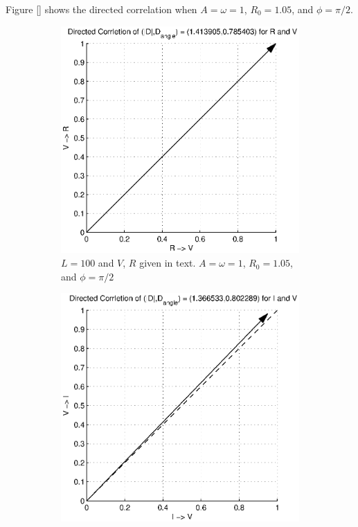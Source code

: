 \documentclass[a4paper,11pt]{article}
\begin{document}
Figure \ref{} shows the directed correlation when $A=\omega=1$, $R_0=1.05$, and $\phi=\pi/2$.
\begin{figure}[h!t]
\centering
\begin{subfigure}[b]{0.25\textwidth}
\label{fig:RL_Rsin3VsinCCMVR}
\includegraphics[scale=0.4]{graphics/RL_Rsin3VsinCCMVR.eps}
\caption{$L = 100$ and $V$, $R$ given in text. $A=\omega=1$, $R_0=1.05$, and $\phi=\pi/2$}
\end{subfigure}
\begin{subfigure}[b]{0.25\textwidth}
\label{fig:RL_Rsin3VsinCCMVI}
\includegraphics[scale=0.4]{graphics/RL_Rsin3VsinCCMVI.eps}

\end{subfigure}
\end{figure}
\end{document}
